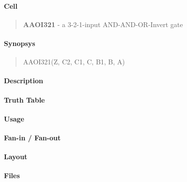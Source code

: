 \label{AAOI321}
\paragraph{Cell}
\begin{quote}
    \textbf{AAOI321} - a 3-2-1-input AND-AND-OR-Invert gate
\end{quote}

\paragraph{Synopsys}
\begin{quote}
    AAOI321(Z, C2, C1, C, B1, B, A)
\end{quote}

\paragraph{Description}



\paragraph{Truth Table}


\paragraph{Usage}

\paragraph{Fan-in / Fan-out}

\paragraph{Layout}

\paragraph{Files}
